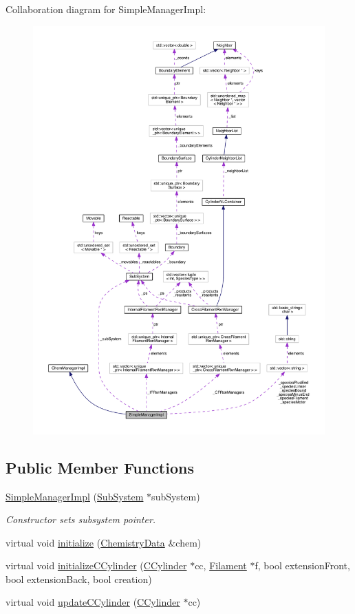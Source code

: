 Collaboration diagram for Simple\+Manager\+Impl\+:
\nopagebreak
\begin{figure}[H]
\begin{center}
\leavevmode
\includegraphics[width=350pt]{classSimpleManagerImpl__coll__graph}
\end{center}
\end{figure}
\subsection*{Public Member Functions}
\begin{DoxyCompactItemize}
\item 
\hyperlink{classSimpleManagerImpl_a7a427f95f5745e69aa57cb63a0570915}{Simple\+Manager\+Impl} (\hyperlink{classSubSystem}{Sub\+System} $\ast$sub\+System)
\begin{DoxyCompactList}\small\item\em Constructor sets subsystem pointer. \end{DoxyCompactList}\item 
virtual void \hyperlink{classSimpleManagerImpl_a1db7aeaed44ae7c9cdc506176af6d186}{initialize} (\hyperlink{structChemistryData}{Chemistry\+Data} \&chem)
\item 
virtual void \hyperlink{classSimpleManagerImpl_ae4e23427c4e406bb9ad99d13099f7f02}{initialize\+C\+Cylinder} (\hyperlink{classCCylinder}{C\+Cylinder} $\ast$cc, \hyperlink{classFilament}{Filament} $\ast$f, bool extension\+Front, bool extension\+Back, bool creation)
\item 
virtual void \hyperlink{classSimpleManagerImpl_af8546bec65b406009203066059f88052}{update\+C\+Cylinder} (\hyperlink{classCCylinder}{C\+Cylinder} $\ast$cc)
\end{DoxyCompactItemize}
